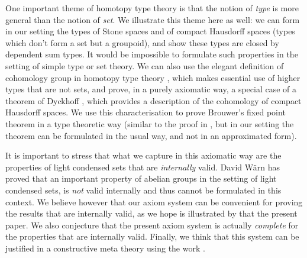 One important theme of homotopy type theory is that the notion of {\em type} is more general than the notion of {\em set}. We illustrate
this theme here as well: we can form in our setting the types of Stone spaces and of compact Hausdorff spaces
(types which don't form a set but a groupoid),
and show these types are
closed by dependent sum types. It would be impossible to formulate such properties in the setting of simple type or set theory.
We can also use the elegant definition of cohomology group in homotopy type theory \cite{hott}, which makes essential
use of higher types that are not sets, and prove, in a purely axiomatic way,
a special case of a theorem of Dyckhoff \cite{dyckhoff76}, which provides
a description of the cohomology of compact Hausdorff spaces. We use this characterisation to prove Brouwer's fixed point theorem
in a type theoretic way (similar to the proof in \cite{shulman-Brouwer-fixed-point}, but
in our setting the theorem can be formulated in the usual
way, and not in an approximated form).

It is important to stress that what we capture in this axiomatic way are the properties of light condensed
sets that are {\em internally} valid. David W\"arn \cite{warn24} has proved that an important property of abelian
groups in the setting of light condensed sets, is {\em not} valid internally and thus cannot be formulated in this context.
We believe however that our axiom system can be convenient for proving the results that are internally valid, as we hope
is illustrated by that the present paper. We also conjecture that the present axiom system is actually {\em complete}
for the properties that are internally valid. Finally, we think that this system can be justified in a constructive meta theory
using the work \cite{CRS21}.
